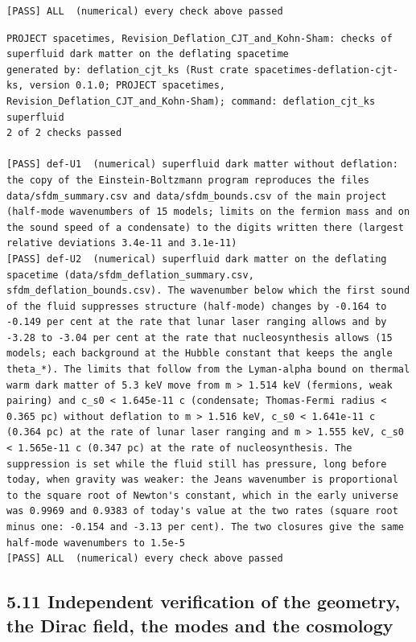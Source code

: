 \documentclass[
  10pt,
]{article}
\begin{document}
\begin{verbatim}
[PASS] ALL  (numerical) every check above passed
\end{verbatim}

\begin{verbatim}
PROJECT spacetimes, Revision_Deflation_CJT_and_Kohn-Sham: checks of superfluid dark matter on the deflating spacetime
generated by: deflation_cjt_ks (Rust crate spacetimes-deflation-cjt-ks, version 0.1.0; PROJECT spacetimes, Revision_Deflation_CJT_and_Kohn-Sham); command: deflation_cjt_ks superfluid
2 of 2 checks passed

[PASS] def-U1  (numerical) superfluid dark matter without deflation: the copy of the Einstein-Boltzmann program reproduces the files data/sfdm_summary.csv and data/sfdm_bounds.csv of the main project (half-mode wavenumbers of 15 models; limits on the fermion mass and on the sound speed of a condensate) to the digits written there (largest relative deviations 3.4e-11 and 3.1e-11)
[PASS] def-U2  (numerical) superfluid dark matter on the deflating spacetime (data/sfdm_deflation_summary.csv, sfdm_deflation_bounds.csv). The wavenumber below which the first sound of the fluid suppresses structure (half-mode) changes by -0.164 to -0.149 per cent at the rate that lunar laser ranging allows and by -3.28 to -3.04 per cent at the rate that nucleosynthesis allows (15 models; each background at the Hubble constant that keeps the angle theta_*). The limits that follow from the Lyman-alpha bound on thermal warm dark matter of 5.3 keV move from m > 1.514 keV (fermions, weak pairing) and c_s0 < 1.645e-11 c (condensate; Thomas-Fermi radius < 0.365 pc) without deflation to m > 1.516 keV, c_s0 < 1.641e-11 c (0.364 pc) at the rate of lunar laser ranging and m > 1.555 keV, c_s0 < 1.565e-11 c (0.347 pc) at the rate of nucleosynthesis. The suppression is set while the fluid still has pressure, long before today, when gravity was weaker: the Jeans wavenumber is proportional to the square root of Newton's constant, which in the early universe was 0.9969 and 0.9383 of today's value at the two rates (square root minus one: -0.154 and -3.13 per cent). The two closures give the same half-mode wavenumbers to 1.5e-5
[PASS] ALL  (numerical) every check above passed
\end{verbatim}

\hypertarget{independent-verification-of-the-geometry-the-dirac-field-the-modes-and-the-cosmology}{%
\subsection{5.11 Independent verification of the geometry, the Dirac
field, the modes and the
cosmology}\label{independent-verification-of-the-geometry-the-dirac-field-the-modes-and-the-cosmology}}
\end{document}
